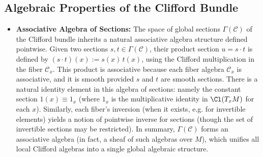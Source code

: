 \documentclass[12pt]{article}
\begin{document}
\subsection{Algebraic Properties of the Clifford Bundle}
\begin{itemize}
    \item \textbf{Associative Algebra of Sections:} The space of global sections $\Gamma(\mathcal{C})$ of the Clifford bundle inherits a natural associative algebra structure defined pointwise. Given two sections $s, t \in \Gamma(\mathcal{C})$, their product section $u = s \cdot t$ is defined by $(s \cdot t)(x) := s(x)\,t(x)$, using the Clifford multiplication in the fiber $\mathcal{C}_x$. This product is associative because each fiber algebra $\mathcal{C}_x$ is associative, and it is smooth provided $s$ and $t$ are smooth sections. There is a natural identity element in this algebra of sections: namely the constant section $1(x) \equiv 1_{x}$ (where $1_x$ is the multiplicative identity in $\Cl(T_xM)$ for each $x$). Similarly, each fiber’s inversion (when it exists, e.g. for invertible elements) yields a notion of pointwise inverse for sections (though the set of invertible sections may be restricted). In summary, $\Gamma(\mathcal{C})$ forms an associative algebra (in fact, a sheaf of such algebras over $M$), which unifies all local Clifford algebras into a single global algebraic structure.


\end{itemize}
\end{document}
